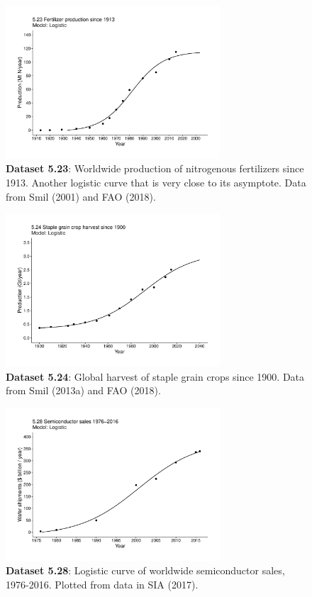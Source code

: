 \documentclass[aps,rmp,preprint,superscriptaddress,10pt,onecolumn]{article}
\begin{document}
\begin{figure}[h]
\includegraphics[width=8cm]{output/figs-ggplot/5.23.pdf}
\caption{\textbf{Dataset 5.23}: Worldwide production of nitrogenous fertilizers since 1913. Another logistic curve that is very close to its asymptote. Data from Smil (2001) and FAO (2018).}
\end{figure}
	
\begin{figure}[h]
\includegraphics[width=8cm]{output/figs-ggplot/5.24.pdf}
\caption{\textbf{Dataset 5.24}: Global harvest of staple grain crops since 1900. Data from Smil (2013a) and FAO (2018).}
\end{figure}
	
\begin{figure}[h]
\includegraphics[width=8cm]{output/figs-ggplot/5.28.pdf}
\caption{\textbf{Dataset 5.28}: Logistic curve of worldwide semiconductor sales, 1976-2016. Plotted from data in SIA (2017).}
\end{figure}
	
\end{document}
